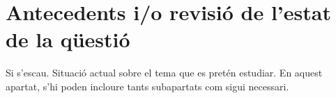 \chapter{Antecedents i/o revisió de l’estat de la qüestió}

Si s’escau. Situació actual sobre el tema que es pretén estudiar. En aquest apartat, s’hi poden incloure tants subapartats com sigui necessari.